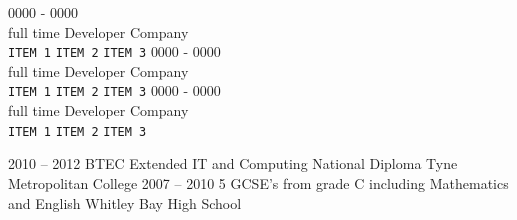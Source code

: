\documentclass[9pt]{cv}
\begin{document}


\begin{entrylist}
	\entry
		{0000 - 0000\\\footnotesize{full time}}
		{Developer}
		{Company}
		{\lorem\\
		\texttt{ITEM 1}\slashsep
		\texttt{ITEM 2}\slashsep
		\texttt{ITEM 3}}
	\entry
		{0000 - 0000\\\footnotesize{full time}}
		{Developer}
		{Company}
		{\lorem\\
		\texttt{ITEM 1}\slashsep
		\texttt{ITEM 2}\slashsep
		\texttt{ITEM 3}}
	\entry
		{0000 - 0000\\\footnotesize{full time}}
		{Developer}
		{Company}
		{\lorem\\
		\texttt{ITEM 1}\slashsep
		\texttt{ITEM 2}\slashsep
		\texttt{ITEM 3}}
\end{entrylist}



\begin{entrylist}
	\entry
		{2010 -- 2012}
		{BTEC Extended IT and Computing National Diploma}
		{Tyne Metropolitan College}
		{}
	\entry
		{2007 -- 2010}
		{5 GCSE's from grade C including Mathematics and English}
		{Whitley Bay High School}
		{}
\end{entrylist}


\begin{minipage}[t]{0.3\textwidth}
	\vspace{-\baselineskip}

	
	\lorem
\end{minipage}
\hfill
\begin{minipage}[t]{0.3\textwidth}
	\vspace{-\baselineskip}
	
	
	\lorem
\end{minipage}
\hfill
\begin{minipage}[t]{0.3\textwidth}
	\vspace{-\baselineskip}
	

	\lorem
\end{minipage}
\end{document}
